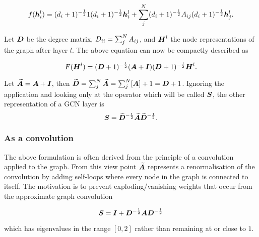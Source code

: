 \begin{equation}
    f({\bm{h}}_i^l) = (d_i + 1)^{-\frac12}1(d_i + 1)^{-\frac12}{\bm{h}}_i^l + \sum_j^N(d_i + 1)^{-\frac12}{A}_{ij}(d_i + 1)^{-\frac12}{\bm{h}}_j^{l}.
\end{equation}

Let ${\bm{D}}$ be the degree matrix, ${D}_{ii} = \sum_j^N {A}_{ij}$, and ${\bm{H}}^l$ the node representations of the graph after layer $l$. The above equation can now be compactly described as 

\begin{equation}
    F({\bm{H}}^l) = ({\bm{D}} + 1)^{-\frac12}({\bm{A}} + {\bm{I}})({\bm{D}} + 1)^{-\frac12}{\bm{H}}^l.
\end{equation}

Let $\widetilde{{\bm{A}}} = {\bm{A}} + {\bm{I}}$, then $\widetilde{{\bm{D}}} = \sum_j^N \widetilde{{\bm{A}}} = \sum_j^N[{\bm{A}}] + 1 = {\bm{D}} + 1$.
Ignoring the application and looking only at the operator which will be called ${\bm{S}}$, the other representation of a GCN layer is
\begin{equation}
    {\bm{S}} = \widetilde{{\bm{D}}}^{-\frac12}\widetilde{{\bm{A}}}\widetilde{{\bm{D}}}^{-\frac12}.
\end{equation}

\subsubsection{As a convolution}

The above formulation is often derived from the principle of a convolution applied to the graph.
From this view point $\widetilde{{\bm{A}}}$ represents a renormalisation of the convolution by adding self-loops where every node in the graph is connected to itself.
The motivation is to prevent exploding/vanishing weights that occur from the approximate graph convolution

\begin{equation}
    {\bm{S}} = {\bm{I}} + {\bm{D}}^{-\frac12}{\bm{A}}{\bm{D}}^{-\frac12}
\end{equation}

which has eigenvalues in the range $[0,2]$ rather than remaining at or close to $1$.





